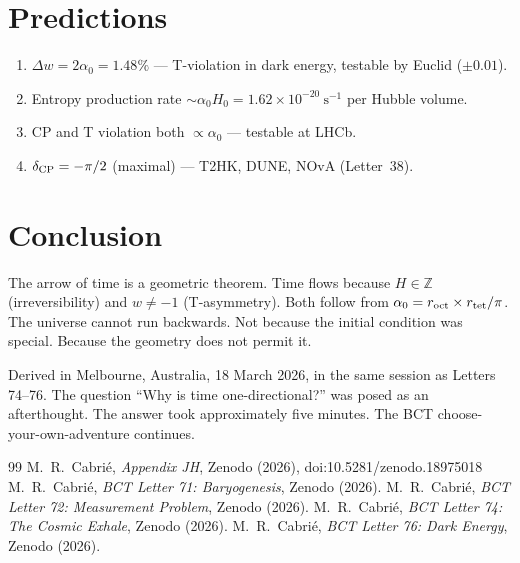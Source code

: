 \documentclass[aps,prl,twocolumn,showpacs,superscriptaddress]{revtex4-2}
\begin{document}
\section{Predictions}

\begin{enumerate}
\item $\Delta w = 2\alpha_0 = 1.48\%$ --- T-violation in dark energy, 
testable by Euclid ($\pm 0.01$).
\item Entropy production rate $\sim \alpha_0 H_0 = 1.62\times10^{-20}~\text{s}^{-1}$ 
per Hubble volume.
\item CP and T violation both $\propto \alpha_0$ --- testable at LHCb.
\item $\delta_{\rm CP} = -\pi/2$ (maximal) --- T2HK, DUNE, NOvA (Letter~38).
\end{enumerate}

\section{Conclusion}

The arrow of time is a geometric theorem. Time flows because $H \in \mathbb{Z}$ 
(irreversibility) and $w \neq -1$ (T-asymmetry). Both follow from 
$\alpha_0 = r_{\rm oct} \times r_{\rm tet}/\pi$. The universe cannot run 
backwards. Not because the initial condition was special. Because the geometry 
does not permit it.

\begin{acknowledgments}
Derived in Melbourne, Australia, 18 March 2026, in the same session as 
Letters 74--76. The question ``Why is time one-directional?'' was posed as an 
afterthought. The answer took approximately five minutes. The BCT 
choose-your-own-adventure continues.
\end{acknowledgments}

\begin{thebibliography}{99}
 M.~R.~Cabri\'e, \textit{Appendix JH}, Zenodo (2026),
doi:10.5281/zenodo.18975018
 M.~R.~Cabri\'e, \textit{BCT Letter 71: Baryogenesis}, Zenodo (2026).
 M.~R.~Cabri\'e, \textit{BCT Letter 72: Measurement Problem}, Zenodo (2026).
 M.~R.~Cabri\'e, \textit{BCT Letter 74: The Cosmic Exhale}, Zenodo (2026).
 M.~R.~Cabri\'e, \textit{BCT Letter 76: Dark Energy}, Zenodo (2026).
\end{thebibliography}
\end{document}
